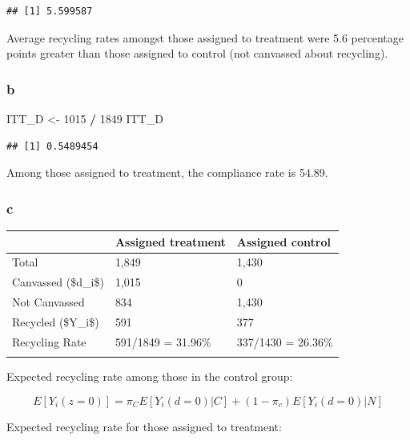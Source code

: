 \documentclass[
]{article}
\newenvironment{Shaded}{\begin{snugshade}}{\end{snugshade}}
\newcommand{\DecValTok}[1]{\textcolor[rgb]{0.00,0.00,0.81}{#1}}
\newcommand{\NormalTok}[1]{#1}
\newcommand{\OtherTok}[1]{\textcolor[rgb]{0.56,0.35,0.01}{#1}}
\newcommand{\SpecialCharTok}[1]{\textcolor[rgb]{0.81,0.36,0.00}{\textbf{#1}}}
\newcounter{none} %
\begin{document}
\begin{verbatim}
## [1] 5.599587
\end{verbatim}

Average recycling rates amongst those assigned to treatment were 5.6
percentage points greater than those assigned to control (not canvassed
about recycling).

\subsubsection{b}\label{b-3}

\begin{Shaded}
\begin{Highlighting}[]
\NormalTok{ITT\_D }\OtherTok{\textless{}{-}} \DecValTok{1015} \SpecialCharTok{/} \DecValTok{1849}
\NormalTok{ITT\_D}
\end{Highlighting}
\end{Shaded}

\begin{verbatim}
## [1] 0.5489454
\end{verbatim}

Among those assigned to treatment, the compliance rate is 54.89.

\subsubsection{c}\label{c-3}

{\def\LTcaptype{none} %
\begin{longtable}[]{@{}lll@{}}
\toprule\noalign{}
& Assigned treatment & Assigned control \\
\midrule\noalign{}
\endhead
\bottomrule\noalign{}
\endlastfoot
Total & 1,849 & 1,430 \\
Canvassed (\$d\_i\$) & 1,015 & 0 \\
Not Canvassed & 834 & 1,430 \\
Recycled (\$Y\_i\$) & 591 & 377 \\
Recycling Rate & 591/1849 = 31.96\% & 337/1430 = 26.36\% \\
& & \\
\end{longtable}
}

Expected recycling rate among those in the control group:

\[
E[Y_i(z=0)] = \pi_CE[Y_i(d=0)|C] + (1 - \pi_c)E[Y_i(d=0)|N]
\]

Expected recycling rate for those assigned to treatment:
\end{document}

